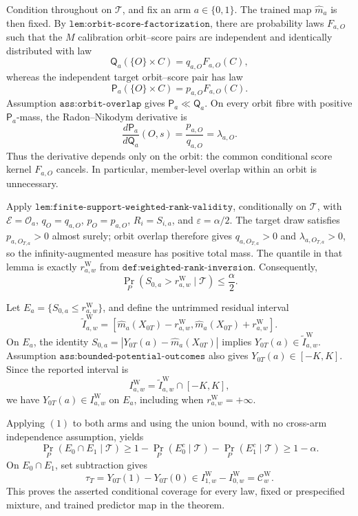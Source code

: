 Condition throughout on \(\mathcal T\), and fix an arm \(a\in\{0,1\}\). The trained map \(\widehat m_a\) is then fixed. By \(\texttt{lem:orbit-score-factorization}\), there are probability laws \(F_{a,O}\) such that the \(M\) calibration orbit--score pairs are independent and identically distributed with law
\[
\mathsf Q_a(\{O\}\times C)=q_{a,O}F_{a,O}(C),
\]
whereas the independent target orbit--score pair has law
\[
\mathsf P_a(\{O\}\times C)=p_{a,O}F_{a,O}(C).
\]
Assumption \(\texttt{ass:orbit-overlap}\) gives \(\mathsf P_a\ll\mathsf Q_a\). On every orbit fibre with positive \(\mathsf P_a\)-mass, the Radon--Nikodym derivative is
\[
\frac{d\mathsf P_a}{d\mathsf Q_a}(O,s)=\frac{p_{a,O}}{q_{a,O}}=\lambda_{a,O}.
\]
Thus the derivative depends only on the orbit: the common conditional score kernel \(F_{a,O}\) cancels. In particular, member-level overlap within an orbit is unnecessary.

Apply \(\texttt{lem:finite-support-weighted-rank-validity}\), conditionally on \(\mathcal T\), with \(\mathscr E=\mathcal O_a\), \(q_O=q_{a,O}\), \(p_O=p_{a,O}\), \(R_i=S_{i,a}\), and \(\varepsilon=\alpha/2\). The target draw satisfies \(p_{a,O_{T,a}}>0\) almost surely; orbit overlap therefore gives \(q_{a,O_{T,a}}>0\) and \(\lambda_{a,O_{T,a}}>0\), so the infinity-augmented measure has positive total mass. The quantile in that lemma is exactly \(r^{\mathrm W}_{a,w}\) from \(\texttt{def:weighted-rank-inversion}\). Consequently,
\[
\Pr_P\!\left(S_{0,a}>r^{\mathrm W}_{a,w}\mid\mathcal T\right)\le\frac{\alpha}{2}.
\tag{1}
\]

Let \(E_a=\{S_{0,a}\le r^{\mathrm W}_{a,w}\}\), and define the untrimmed residual interval
\[
\widetilde I^{\mathrm W}_{a,w}=\left[\widehat m_a(X_{0T})-r^{\mathrm W}_{a,w},\widehat m_a(X_{0T})+r^{\mathrm W}_{a,w}\right].
\]
On \(E_a\), the identity \(S_{0,a}=|Y_{0T}(a)-\widehat m_a(X_{0T})|\) implies \(Y_{0T}(a)\in\widetilde I^{\mathrm W}_{a,w}\). Assumption \(\texttt{ass:bounded-potential-outcomes}\) also gives \(Y_{0T}(a)\in[-K,K]\). Since the reported interval is
\[
I^{\mathrm W}_{a,w}=\widetilde I^{\mathrm W}_{a,w}\cap[-K,K],
\]
we have \(Y_{0T}(a)\in I^{\mathrm W}_{a,w}\) on \(E_a\), including when \(r^{\mathrm W}_{a,w}=+\infty\).

Applying \((1)\) to both arms and using the union bound, with no cross-arm independence assumption, yields
\[
\Pr_P(E_0\cap E_1\mid\mathcal T)\ge 1-\Pr_P(E_0^c\mid\mathcal T)-\Pr_P(E_1^c\mid\mathcal T)\ge1-\alpha.
\]
On \(E_0\cap E_1\), set subtraction gives
\[
\tau_T=Y_{0T}(1)-Y_{0T}(0)\in I^{\mathrm W}_{1,w}-I^{\mathrm W}_{0,w}=\mathcal C^{\mathrm W}_w.
\]
This proves the asserted conditional coverage for every law, fixed or prespecified mixture, and trained predictor map in the theorem.

